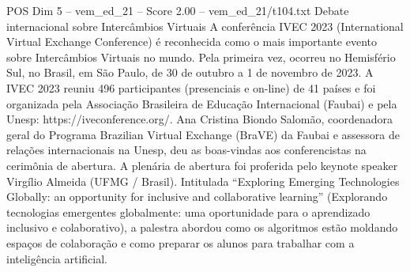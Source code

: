\begin{textsample}{POS Dim 5 – vem\_ed\_21 – Score 2.00 – vem\_ed\_21/t104.txt}  \label{ex:f5_pos_089}
Debate internacional sobre Intercâmbios Virtuais A conferência IVEC 2023 (International Virtual Exchange Conference) é reconhecida como o mais importante evento sobre Intercâmbios Virtuais no mundo.
Pela primeira vez, ocorreu no Hemisfério Sul, no Brasil, em São Paulo, de 30 de outubro a 1 de novembro de 2023.
A IVEC 2023 reuniu 496 participantes (presenciais e on-line) de 41 países e foi organizada pela Associação Brasileira de Educação Internacional (Faubai) e pela Unesp: https://iveconference.org/.
Ana Cristina Biondo Salomão, coordenadora geral do Programa Brazilian Virtual Exchange (BraVE) da Faubai e assessora de relações internacionais na Unesp, deu as boas-vindas aos conferencistas na cerimônia de abertura.
A plenária de abertura foi proferida pelo keynote speaker Virgílio Almeida (UFMG / Brasil).
Intitulada “Exploring Emerging Technologies Globally: an opportunity for inclusive and collaborative learning” (Explorando tecnologias emergentes globalmente: uma oportunidade para o aprendizado inclusivo e colaborativo), a palestra abordou como os algoritmos estão moldando espaços de colaboração e como preparar os alunos para trabalhar com a inteligência artificial.

\end{textsample}
